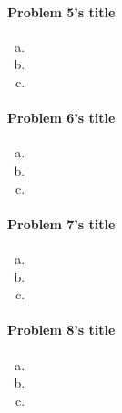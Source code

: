 \documentclass{article}
\begin{document}
\paragraph{Problem 5's title} %
\begin{enumerate}[a.]
    \item
    \item
    \item
\end{enumerate}

\paragraph{Problem 6's title} %
\begin{enumerate}[a.]
    \item
    \item
    \item
\end{enumerate}

\paragraph{Problem 7's title} %
\begin{enumerate}[a.]
    \item
    \item
    \item
\end{enumerate}

\paragraph{Problem 8's title} %
\begin{enumerate}[a.]
    \item
    \item
    \item
\end{enumerate}
\end{document}
